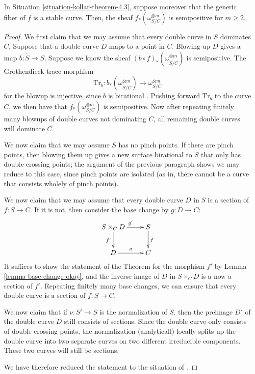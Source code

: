 \begin{theorem}[cf.\ {\cite[Theorem 4.3]{Ko90}}]
\label{theorem-kollar-theorem-4.3}
In Situation \ref{situation-kollar-theorem-4.3}, suppose moreover that the
generic fiber of $f$ is a stable curve. Then,
the sheaf $f_*(\omega_{S/C}^{\otimes m})$ is semipositive for $m \ge 2$.
\end{theorem}
\begin{proof}
We first claim that we may assume that every double curve in $S$ dominates $C$.
Suppose that a double curve $D$ maps to a point in $C$.
Blowing up $D$ gives a map $b :
\widetilde{S} \to S$.
Suppose we know the sheaf $(b \circ f)_*(\omega_{\widetilde{S}/C}^{\otimes m})$
is semipositive.
The Grothendieck trace morphism
$$
\mathrm{Tr}_b : b_*(\omega_{\widetilde{S}/C}^{\otimes m})
\longrightarrow \omega_{S/C}^{\otimes m}
$$
for the blowup is injective, since $b$ is birational \cite[Prop.\ 5.77]{KM}.
Pushing forward $\mathrm{Tr}_b$ to the curve $C$, we then have that
$f_*(\omega_{S/C}^{\otimes m})$ is semipositive.
Now after repeating finitely many blowups of double curves not dominating $C$,
all remaining double curves will dominate $C$.

We now claim that we may assume $S$ has no pinch points. If there are pinch
points, then blowing them up gives a new surface birational to $S$ that only has
double crossing points; the argument of the previous paragraph shows we may
reduce to this case, since pinch points are isolated (as in, there cannot be a
curve that consists wholely of pinch points).

We now claim that we may assume that every double curve $D$ in $S$ is a
section of $f : S \to C$.
If it is not, then consider the base change by $g : D \to C$:
$$
\xymatrix{
S \times_C D \ar[r]^{g'}\ar[d]_{f'} & S \ar[d]^f\\
D \ar[r]^g & C
}
$$
It suffices to show the statement of the Theorem for the morphism $f'$ by Lemma
\ref{lemma-base-change-okay}, and the inverse image of $D$ in $S \times_C D$ is
a now a section of $f'$.
Repeating finitely many base changes, we can ensure that every double curve is a
section of $f : S \to C$.

We now claim that if $\nu : S' \to S$ is the normalization of $S$, then the
preimage $D'$ of the double curve $D$ still consists of sections.
Since the double curve only consists of double crossing points, the
normalization (analyticall) locally splits up the double curve into two separate
curves on two different irreducible components.
These two curves will still be sections.

We have therefore reduced the statement to the situation of \cite[Proposition
4.9]{Ko90}.
\end{proof}






